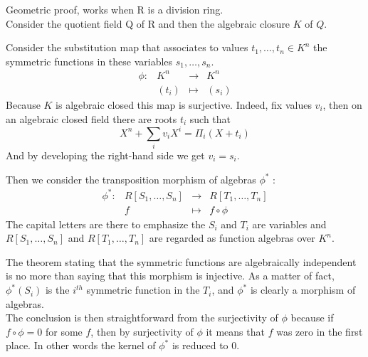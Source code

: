 \documentclass[12pt]{article}
\begin{document}
Geometric proof, works when R is a division ring.\\

Consider the quotient field Q of R and then the algebraic closure $K$ of $Q$.

Consider the substitution map that associates to values $t_1,\ldots,t_n \in K^n$ the symmetric functions in these variables $s_1,\ldots,s_n$.
$$\begin{array}{lccr}
\phi: & K^n & \to & K^n\\
      &  (t_i) & \mapsto & (s_i)
\end{array}
$$
Because $K$ is algebraic closed this map is surjective. Indeed, fix values $v_i$, then on an algebraic closed field there are roots $t_i$ such that 
$$X^n + \sum_i v_i X^i = \Pi_i (X+t_i)$$
And by developing the right-hand side we get $v_i = s_i$.

Then we consider the transposition morphism of algebras $\phi^*$ :
$$\begin{array}{lccr}
\phi^*: & R[S_1,\ldots,S_n] & \to & R[T_1,\ldots,T_n]\\
      & f & \mapsto & f\circ\phi
\end{array}
$$
The capital letters are there to emphasize the $S_i$ and $T_i$ are variables and $R[S_1,\ldots,S_n]$ and $R[T_1,\ldots,T_n]$ are regarded as function algebras over $K^n$.

The theorem stating that the symmetric functions are algebraically independent is no more than saying that this morphism is injective.
As a matter of fact, $\phi^*(S_i)$ is the $i^{th}$ symmetric function in the $T_i$, and $\phi^*$ is clearly a morphism of algebras.\\
The conclusion is then straightforward from the surjectivity of $\phi$ because if $f\circ\phi = 0$ for some $f$, then by surjectivity of $\phi$ it means that $f$ was zero in the first place. In other words the kernel of $\phi^*$ is reduced to 0.
\end{document}

